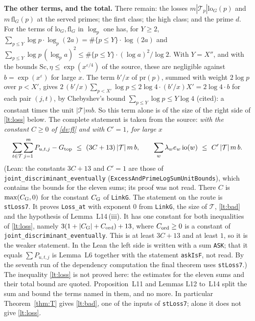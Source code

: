 \documentclass[11pt,letterpaper]{article}
\begin{document}
\textbf{The other terms, and the total.} There remain: the losses $m|\mathcal T_p|\mathrm{lo}_G(p)$ and
$m\,\mathrm{fl}_G(p)$ at the served primes; the first class; the high class; and the prime $d$. For the
terms of $\mathrm{lo}_G,\mathrm{fl}_G$ in $\log_p$ one has, for $Y\ge2$,
$\sum_{p\le Y}\log p\cdot\log_p(2a)=\#\{p\le Y\}\cdot\log(2a)$ and
$\sum_{p\le Y}\log p\,(\log_pa)^2\le\#\{p\le Y\}\cdot(\log a)^2/\log2$. With $Y=X''$, and with the bounds
$\mathrm{Sc},\eta\le\exp(x^{\varepsilon/4})$ of the source, these are negligible against
$b=\exp(x^{\varepsilon})$ for large $x$. The term $b'/x$ of $\mathrm{pr}(p)$, summed with weight $2\log p$
over $p<X'$, gives $2\,(b'/x)\sum_{p<X'}\log p\le2\log4\cdot(b'/x)X'=2\log4\cdot b$ for each pair $(j,t)$,
by Chebyshev's bound $\sum_{p\le Y}\log p\le Y\log4$ (cited): a constant times the unit
$|\mathcal T|mb$. So this term alone is of the size of the right side of \eqref{lt:loss} below. The
complete statement is taken from the source: \emph{with the constant $C\ge0$ of \eqref{dv:fl} and with
$C'=1$, for large $x$}
\begin{equation}\label{lt:loss}
 \sum_{t\in\mathcal T}\sum_{j=1}^mP_{u,t,j}-G_{\rm top}\ \le\ (3C+13)\,|\mathcal T|\,m\,b,\qquad
 \sum_w\lambda_we_w\,\mathrm{io}(w)\ \le\ C'\,|\mathcal T|\,m\,b .
\end{equation}
(Lean: the constants $3C+13$ and $C'=1$ are those of \texttt{joint\_discriminant\_eventually}
(\texttt{ExcessAndPrimeLogSumUnitBounds}), which contains the bounds for the eleven sums; its proof was not
read. There $C$ is $\max(C_{\rm G},0)$ for the constant $C_{\rm G}$ of \texttt{LinkG}. The statement on the
route is \texttt{stLoss7}. It proves \texttt{Loss\_at} with exponent $0$ from \texttt{LinkG}, the size of
$\mathcal T$, \eqref{lt:bad} and the hypothesis of Lemma~L14\,(iii). It has one constant for both
inequalities of \eqref{lt:loss}, namely $3(1+|C_{\rm G}|+C_{\rm ord})+13$, where $C_{\rm ord}\ge0$ is a
constant of \texttt{joint\_discriminant\_eventually}. This is at least $3C+13$ and at least $1$, so it is the weaker statement. In the Lean the left side is written
with a sum \texttt{ASK}; that it equals $\sum P_{u,t,j}$ is Lemma~L6 together with the statement
\texttt{askIsF}, not read. By the seventh run of the dependency computation the final theorem uses
\texttt{stLoss7}.) The inequality \eqref{lt:loss} is not proved here: the estimates for the eleven sums and
their total bound are quoted. Proposition~L11 and Lemmas L12 to~L14 split the sum and bound the terms named
in them, and no more. In particular Theorem~\ref{thm:T} gives \eqref{lt:bad}, one of the inputs of
\texttt{stLoss7}; alone it does not give \eqref{lt:loss}.
\end{document}
